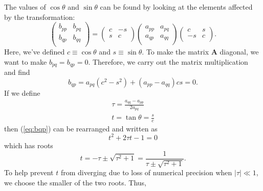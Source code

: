 \documentclass[aps,prc,reprint]{revtex4-1}
\begin{document}
        The values of $\cos\theta$ and $\sin\theta$ can be found by looking at the elements affected by the transformation:
        \begin{equation*}
            \begin{pmatrix}
                b_{pp} & b_{pq} \\
                b_{qp} & b_{qq} \\
            \end{pmatrix}
            =
            \begin{pmatrix}
                c & -s \\
                s & c \\
            \end{pmatrix}
            \begin{pmatrix}
                a_{pp} & a_{pq} \\
                a_{qp} & a_{qq} \\
            \end{pmatrix}
            \begin{pmatrix}
                c & s \\
                -s & c \\
            \end{pmatrix}.
        \end{equation*}
        Here, we've defined $c\equiv\cos\theta$ and $s\equiv\sin\theta$. To make the matrix $\mathbf{A}$ diagonal, we want to make $b_{pq} = b_{qp} = 0$. Therefore, we carry out the matrix multiplication and find
        \begin{equation}
            b_{qp} = a_{pq}(c^2-s^2) + (a_{pp} - a_{qq}) cs = 0.  \label{eq:bqp}
        \end{equation}
        If we define
        \begin{gather}
            \tau = \frac{a_{qq} - a_{pp}}{2a_{pq}}  \label{eq:tau} \\
            t = \tan\theta = \frac{s}{c}
        \end{gather}
        then (\ref{eq:bqp}) can be rearranged and written as
        \begin{equation*}
            t^2 + 2\tau t - 1 = 0
        \end{equation*}
        which has roots
        \begin{equation*}
            t = -\tau \pm \sqrt{\tau^2 + 1} = \frac{1}{\tau \pm \sqrt{\tau^2 + 1}}.
        \end{equation*}
        To help prevent $t$ from diverging due to loss of numerical precision when $|\tau| \ll 1$, we choose the smaller of the two roots. Thus,
\end{document}
